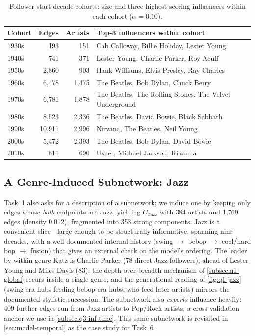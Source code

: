 \begin{table}[htbp]
\centering
\caption{Follower-start-decade cohorts: size and three highest-scoring
influencers within each cohort (\(\alpha=0.10\)).}
\label{tab:q1-cohorts}
\begin{tabular}{lrrl}
\toprule
Cohort & Edges & Artists & Top-3 influencers within cohort \\
\midrule
1930s & 193   & 151  & Cab Calloway, Billie Holiday, Lester Young \\
1940s & 741   & 371  & Lester Young, Charlie Parker, Roy Acuff \\
1950s & 2{,}860  & 903  & Hank Williams, Elvis Presley, Ray Charles \\
1960s & 6{,}478  & 1{,}475 & The Beatles, Bob Dylan, Chuck Berry \\
1970s & 6{,}781  & 1{,}878 & The Beatles, The Rolling Stones, The Velvet Underground \\
1980s & 8{,}523  & 2{,}336 & The Beatles, David Bowie, Black Sabbath \\
1990s & 10{,}911 & 2{,}996 & Nirvana, The Beatles, Neil Young \\
2000s & 5{,}472  & 2{,}393 & The Beatles, Bob Dylan, David Bowie \\
2010s & 811   & 690  & Usher, Michael Jackson, Rihanna \\
\bottomrule
\end{tabular}
\end{table}

\subsection{A Genre-Induced Subnetwork: Jazz}\label{subsec:q1-jazz}

Task~1 also asks for a description of a subnetwork; we induce one by
keeping only edges whose \emph{both} endpoints are Jazz, yielding
$G_{\text{Jazz}}$ with 384 artists and 1{,}769 edges (density 0.012),
fragmented into 353 strong components. Jazz is a convenient slice---large
enough to be structurally informative, spanning nine decades, with a
well-documented internal history (swing $\to$ bebop $\to$ cool/hard bop
$\to$ fusion) that gives an external check on the model's ordering. The
leader by within-genre Katz is Charlie Parker (78 direct Jazz followers),
ahead of Lester Young and Miles Davis (83): the depth-over-breadth
mechanism of \cref{subsec:q1-global} recurs inside a single genre, and the
generational reading of \cref{fig:q1-jazz} (swing-era hubs feeding bebop-era
hubs, who feed later artists) mirrors the documented stylistic succession.
The subnetwork also \emph{exports} influence heavily: 409 further edges run
from Jazz artists to Pop/Rock artists, a cross-validation anchor we use in
\cref{subsec:q3-inf-time}. This same subnetwork is revisited in
\cref{sec:model-temporal} as the case study for Task~6.

